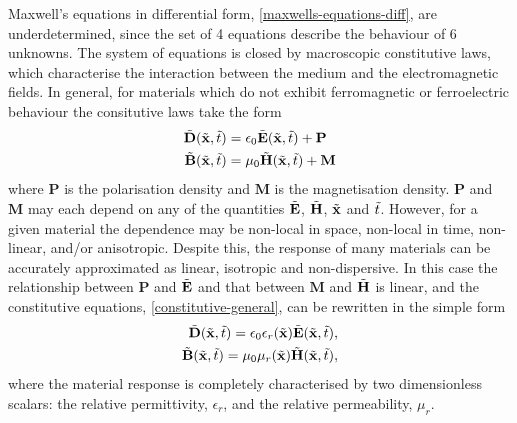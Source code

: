 Maxwell's equations in differential form, \eqref{maxwells-equations-diff}, are underdetermined, since the set of 4 equations describe the behaviour of 6 unknowns. The system of equations is closed by macroscopic constitutive laws, which characterise the interaction between the medium and the electromagnetic fields. In general, for materials which do not exhibit ferromagnetic or ferroelectric behaviour the consitutive laws take the form
\begin{subequations}
    \label{constitutive-general}
    \begin{align}
        \tilde{\mathbf{D}}(\tilde{\mathbf{x}},\tilde{t}) &= \epsilon_0 \tilde{\mathbf{E}}(\tilde{\mathbf{x}},\tilde{t}) + \mathbf{P} \label{constitutive-general-E} \\
        \tilde{\mathbf{B}}(\tilde{\mathbf{x}},\tilde{t}) &= \mu_0 \tilde{\mathbf{H}}(\tilde{\mathbf{x}},\tilde{t}) + \mathbf{M}
    \end{align}
\end{subequations}
where $\mathbf{P}$ is the polarisation density and $\mathbf{M}$ is the magnetisation density. $\mathbf{P}$ and $\mathbf{M}$ may each depend on any of the quantities $\tilde{\mathbf{E}}$, $\tilde{\mathbf{H}}$, $\tilde{\mathbf{x}}$ and $\tilde{t}$. However, for a given material the dependence may be non-local in space, non-local in time, non-linear, and/or anisotropic. Despite this, the response of many materials can be accurately approximated as linear, isotropic and non-dispersive. In this case the relationship between $\mathbf{P}$ and $\tilde{\mathbf{E}}$ and that between $\mathbf{M}$ and $\tilde{\mathbf{H}}$ is linear, and the constitutive equations, \eqref{constitutive-general}, can be rewritten in the simple form
%
\begin{subequations}
    \label{constitutive-linear}
    \begin{align}
        \tilde{\mathbf{D}}(\tilde{\mathbf{x}},\tilde{t}) = \epsilon_0 \epsilon_r(\tilde{\mathbf{x}}) \tilde{\mathbf{E}}(\tilde{\mathbf{x}},\tilde{t}), \label{constitutive-linear-D} \\
        \tilde{\mathbf{B}}(\tilde{\mathbf{x}},\tilde{t}) = \mu_0 \mu_r(\tilde{\mathbf{x}}) \tilde{\mathbf{H}}(\tilde{\mathbf{x}},\tilde{t}),
    \end{align}
\end{subequations}
%
where the material response is completely characterised by two dimensionless scalars: the relative permittivity, $\epsilon_r$, and the relative permeability, $\mu_r$.

